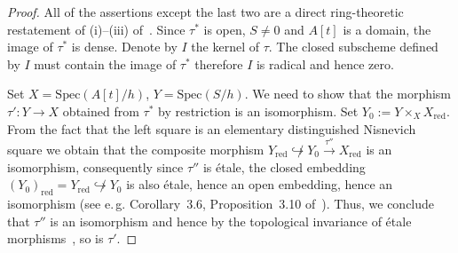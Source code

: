 \documentclass[oneside, 11pt]{amsart}
\numberwithin{equation}{section}
\theoremstyle{definition}
\theoremstyle{definition}
\theoremstyle{remark}
\begin{document}
\begin{proof}
 All of the assertions except the last two are a direct ring-theoretic restatement of (i)--(iii) of~\cite[Theorem~2.5]{Pa19}.
	Since $\tau^*$ is open, $S\neq 0$ and $A[t]$ is a domain, the image of $\tau^*$ is dense. Denote by $I$ the kernel of $\tau$. The closed subscheme defined by $I$ must contain the image of $\tau^*$ therefore $I$ is radical and hence zero.

	Set $X = \mathrm{Spec}(A[t]/h)$, $Y = \mathrm{Spec}(S/h)$. We need to show that the morphism $\tau' \colon Y \to X$ obtained from $\tau^*$ by restriction is an isomorphism. Set $Y_0 := Y \times_{X} X_\mathrm{red}$. From the fact that the left square is an elementary distinguished Nisnevich square we obtain that the composite morphism $Y_\mathrm{red} \not\hookrightarrow Y_0 \xrightarrow{\tau''} X_\mathrm{red}$ is an isomorphism, consequently since $\tau''$ is {\'e}tale, the closed embedding $(Y_0)_\mathrm{red} = Y_\mathrm{red} \not\hookrightarrow Y_0$ is also {\'e}tale, hence an open embedding, hence an isomorphism (see e.\,g. Corollary~3.6, Proposition~3.10 of~\cite{Mi80}). Thus, we conclude that $\tau''$ is an isomorphism and hence by the topological invariance of {\'e}tale morphisms~\cite[Theorem~3.23]{Mi80}, so is $\tau'$.
\end{proof}
\end{document}
